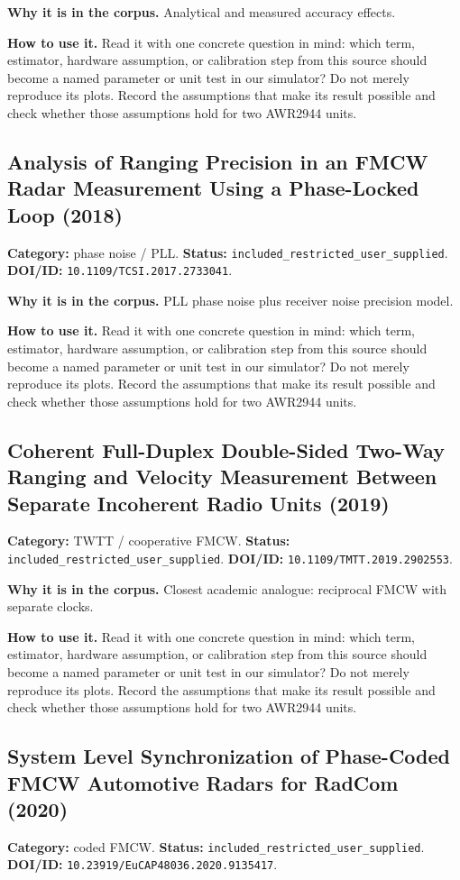 \documentclass[11pt]{article}
\begin{document}
\textbf{Why it is in the corpus.} Analytical and measured accuracy effects.

\textbf{How to use it.} Read it with one concrete question in mind: which term, estimator, hardware assumption, or calibration step from this source should become a named parameter or unit test in our simulator? Do not merely reproduce its plots. Record the assumptions that make its result possible and check whether those assumptions hold for two AWR2944 units.

\subsection*{Analysis of Ranging Precision in an FMCW Radar Measurement Using a Phase-Locked Loop (2018)}
\textbf{Category:} phase noise / PLL. \textbf{Status:} \nolinkurl{included_restricted_user_supplied}. \textbf{DOI/ID:} \nolinkurl{10.1109/TCSI.2017.2733041}.

\textbf{Why it is in the corpus.} PLL phase noise plus receiver noise precision model.

\textbf{How to use it.} Read it with one concrete question in mind: which term, estimator, hardware assumption, or calibration step from this source should become a named parameter or unit test in our simulator? Do not merely reproduce its plots. Record the assumptions that make its result possible and check whether those assumptions hold for two AWR2944 units.

\subsection*{Coherent Full-Duplex Double-Sided Two-Way Ranging and Velocity Measurement Between Separate Incoherent Radio Units (2019)}
\textbf{Category:} TWTT / cooperative FMCW. \textbf{Status:} \nolinkurl{included_restricted_user_supplied}. \textbf{DOI/ID:} \nolinkurl{10.1109/TMTT.2019.2902553}.

\textbf{Why it is in the corpus.} Closest academic analogue: reciprocal FMCW with separate clocks.

\textbf{How to use it.} Read it with one concrete question in mind: which term, estimator, hardware assumption, or calibration step from this source should become a named parameter or unit test in our simulator? Do not merely reproduce its plots. Record the assumptions that make its result possible and check whether those assumptions hold for two AWR2944 units.

\subsection*{System Level Synchronization of Phase-Coded FMCW Automotive Radars for RadCom (2020)}
\textbf{Category:} coded FMCW. \textbf{Status:} \nolinkurl{included_restricted_user_supplied}. \textbf{DOI/ID:} \nolinkurl{10.23919/EuCAP48036.2020.9135417}.
\end{document}
